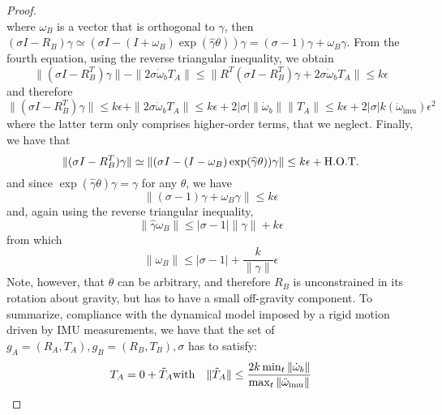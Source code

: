 \documentclass[]{article}
\def\w{\omega}
\def\imu{_\mathrm{imu}}
\begin{document}
\begin{proof}
\begin{equation}
\end{equation}
where $\w_B$ is a vector that is orthogonal to $\gamma$, 
then $(\sigma I - R_B)\gamma \simeq (\sigma I - (I + \w_B)\exp(\widehat \gamma \theta))\gamma = (\sigma - 1)\gamma + \w_B \gamma$. 
From the fourth equation, using the reverse triangular inequality, we obtain 
\begin{equation}
\| (\sigma I - R_B^T)\gamma \| - \| 2\sigma \dot \w_b T_A \| \le \| R^T(\sigma I - R_B^T)\gamma + 2 \sigma \dot\w_b T_A \| \le k\epsilon
\end{equation}
and therefore
\begin{equation}
\| (\sigma I - R_B^T)\gamma \|   \le k\epsilon + \| 2\sigma \dot \w_b T_A \| \le k\epsilon + 2 |\sigma| \|\dot \w_b\| \| T_A \| \le 
k\epsilon + 2 |\sigma| k(\ddot \w\imu ) \epsilon^2 
\end{equation}
where the latter term only comprises higher-order terms, that we neglect. Finally, we have that
\begin{equation}
\| (\sigma I - R_B^T)\gamma \| \simeq \| (\sigma I - (I -\w_B)\exp(\widehat \gamma \theta))\gamma \| \le k\epsilon + {\rm H. O. T.}
\end{equation}
and since $\exp(\widehat \gamma \theta)\gamma = \gamma$ for any $\theta$, we have
\begin{equation}
\| (\sigma -1)\gamma + \w_B \gamma \| \le k\epsilon
\end{equation}
and, again using the reverse triangular inequality, 
\begin{equation}
\| \widehat \gamma \w_B \| \le |\sigma -1| \| \gamma \| +   k \epsilon
\end{equation}
from which 
\begin{equation}
\| \w_B \| \le |\sigma -1|  +  \frac{k}{\| \gamma \|} \epsilon%
\end{equation}
Note, however, that $\theta$ can be arbitrary, and therefore $R_B$ is unconstrained in its rotation about gravity, but has to have a small off-gravity component. To summarize, compliance with the dynamical model imposed by a rigid motion driven by IMU measurements, we have that the set of $g_A = (R_A, T_A), g_B = (R_B, T_B), \sigma$ has to satisfy: 
\begin{eqnarray}
T_A  =  0 + \tilde T_A &{\rm with}& \| \tilde T_A \| \le \frac{2 k \min_t \| \dot \w_b \| }{\max_t \| \ddot \w\imu  \|}  \\

\end{eqnarray}
\end{proof}
\end{document}
